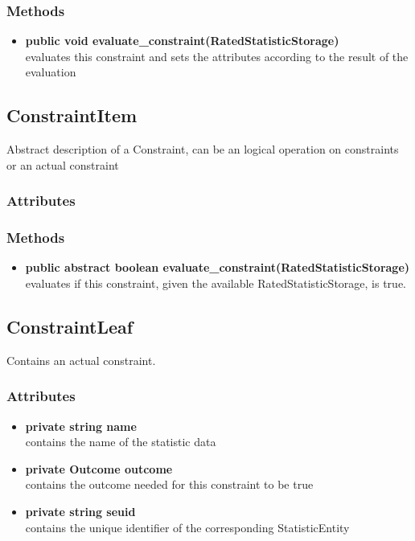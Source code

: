\subsubsection{Methods}
\begin{itemize}
	\item \textbf{ public void evaluate\_constraint(RatedStatisticStorage)  }\\
	evaluates this constraint and sets the attributes according to the result of the evaluation
\end{itemize}



\subsection{ConstraintItem}
	Abstract description of a Constraint, can be an logical operation on constraints or an actual constraint
\subsubsection{Attributes}
\subsubsection{Methods}
\begin{itemize}
	\item \textbf{ public abstract boolean evaluate\_constraint(RatedStatisticStorage) }\\
	evaluates if this constraint, given the available RatedStatisticStorage, is true. 
\end{itemize}		


\subsection{ConstraintLeaf }
Contains an actual constraint.

\subsubsection{Attributes}
\begin{itemize}
	\item \textbf{ private string name }\\
	contains the name of the statistic data
	\item \textbf{ private Outcome outcome }\\
	contains the outcome needed for this constraint to be true
	\item \textbf{ private string seuid }\\
	contains the unique identifier of the corresponding StatisticEntity
\end{itemize}
